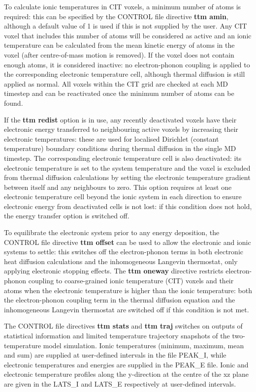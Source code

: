 To calculate ionic temperatures in CIT voxels, a minimum number of 
atoms is required: this can be specified by the CONTROL file directive 
{\bf ttm amin}, although a default value of 1 is used if this is not supplied 
by the user. Any CIT voxel that includes this number of atoms will be 
considered as active and an ionic temperature can be calculated from 
the mean kinetic energy of atoms in the voxel (after centre-of-mass 
motion is removed). If the voxel does not contain enough atoms, it is 
considered inactive: no electron-phonon coupling is applied to the 
corresponding electronic temperature cell, although thermal diffusion is 
still applied as normal. All voxels within the CIT grid are checked 
at each MD timestep and can be reactivated once the minimum number 
of atoms can be found. 

If the {\bf ttm redist} option is in use, any recently deactivated voxels 
have their electronic energy transferred to neighbouring active voxels 
by increasing their electronic temperatures: these are used for localised 
Dirichlet (constant temperature) boundary conditions during thermal 
diffusion in the single MD timestep. The corresponding electronic 
temperature cell is also deactivated: its electronic temperature is set to 
the system temperature and the voxel is excluded from thermal diffusion 
calculations by setting the electronic temperature gradient between itself 
and any neighbours to zero. This option requires at least one electronic 
temperature cell beyond the ionic system in each direction to ensure 
electronic energy from deactivated cells is not lost: if this condition 
does not hold, the energy transfer option is switched off.

To equilibrate the electronic system prior to any energy deposition, 
the CONTROL file directive {\bf ttm offset} can be used to allow the 
electronic and ionic systems to settle: this switches off the 
electron-phonon terms in both electronic heat diffusion calculations 
and the inhomogeneous Langevin thermostat, only applying 
electronic stopping effects. The {\bf ttm oneway} directive restricts 
electron-phonon coupling to coarse-grained ionic temperature (CIT) 
voxels and their atoms when the electronic temperature is higher 
than the ionic temperature: both the electron-phonon coupling term 
in the thermal diffusion equation and the inhomogeneous Langevin 
thermostat are switched off if this condition is not met.

The CONTROL file directives {\bf ttm stats} and {\bf ttm traj} switches 
on outputs of statistical information and limited temperature trajectory 
snapshots of the two-temperature model simulation. Ionic 
temperatures (minimum, maximum, mean and sum) are supplied at 
user-defined intervals in the file PEAK\_I, while electronic temperatures 
and energies are supplied in the PEAK\_E file. Ionic and electronic 
temperature profiles along the y-direction at the centre of the xz plane 
are given in the LATS\_I and LATS\_E respectively at user-defined 
intervals.

